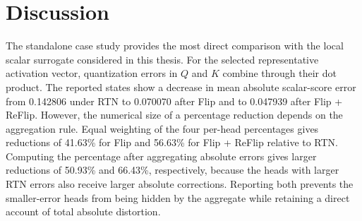 \documentclass[../main.tex]{subfiles}
\begin{document}
\begin{table}[H]
\centering
\caption[4-bit evaluation for Llama-3-8B]{Full-model 4-bit evaluation for Llama-3-8B. Bold marks the best quantized result; underline marks the second-best quantized result.}
\label{tab:full-model-llama3}
\setlength{\tabcolsep}{3pt}
\renewcommand{\arraystretch}{1.12}
\end{table}

\section{Discussion}

The standalone case study provides the most direct comparison with the local scalar surrogate considered in this thesis. For the selected representative activation vector, quantization errors in $Q$ and $K$ combine through their dot product. The reported states show a decrease in mean absolute scalar-score error from 0.142806 under RTN to 0.070070 after Flip and to 0.047939 after Flip + ReFlip. However, the numerical size of a percentage reduction depends on the aggregation rule. Equal weighting of the four per-head percentages gives reductions of 41.63\% for Flip and 56.63\% for Flip + ReFlip relative to RTN. Computing the percentage after aggregating absolute errors gives larger reductions of 50.93\% and 66.43\%, respectively, because the heads with larger RTN errors also receive larger absolute corrections. Reporting both prevents the smaller-error heads from being hidden by the aggregate while retaining a direct account of total absolute distortion.
\end{document}
